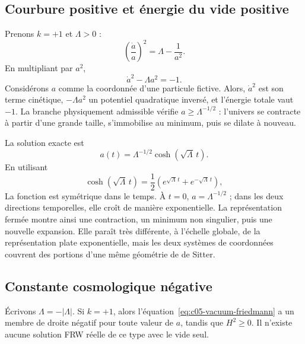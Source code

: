 \subsection{Courbure positive et énergie du vide positive}

Prenons \(k=+1\) et \(\Lambda>0\) :
\begin{equation}
\left(\frac{\dot a}{a}\right)^2=\Lambda-\frac{1}{a^2}.
\label{eq:c05-closed-vacuum}
\end{equation}
En multipliant par \(a^2\),
\begin{equation}
\dot a^2-\Lambda a^2=-1.
\label{eq:c05-inverted-oscillator}
\end{equation}
Considérons \(a\) comme la coordonnée d’une particule fictive. Alors, \(\dot a^2\) est son terme cinétique, \(-\Lambda a^2\) un potentiel quadratique inversé, et l’énergie totale vaut \(-1\). La branche physiquement admissible vérifie \(a\geq\Lambda^{-1/2}\) : l’univers se contracte à partir d’une grande taille, s’immobilise au minimum, puis se dilate à nouveau.

La solution exacte est
\begin{equation}
a(t)=\Lambda^{-1/2}\cosh(\sqrt{\Lambda}\,t).
\label{eq:c05-closed-desitter}
\end{equation}
En utilisant
\begin{equation}
\cosh(\sqrt{\Lambda}\,t)
=
\frac12\left(e^{\sqrt{\Lambda}\,t}+e^{-\sqrt{\Lambda}\,t}\right),
\end{equation}
La fonction est symétrique dans le temps. À \(t=0\), \(a=\Lambda^{-1/2}\) ; dans les deux directions temporelles, elle croît de manière exponentielle. La représentation fermée montre ainsi une contraction, un minimum non singulier, puis une nouvelle expansion. Elle paraît très différente, à l’échelle globale, de la représentation plate exponentielle, mais les deux systèmes de coordonnées couvrent des portions d’une même géométrie de de Sitter.

\subsection{Constante cosmologique négative}

Écrivons \(\Lambda=-|\Lambda|\). Si \(k=+1\), alors l’équation~\eqref{eq:c05-vacuum-friedmann} a un membre de droite négatif pour toute valeur de \(a\), tandis que \(H^2\geq0\). Il n’existe aucune solution FRW réelle de ce type avec le vide seul.

